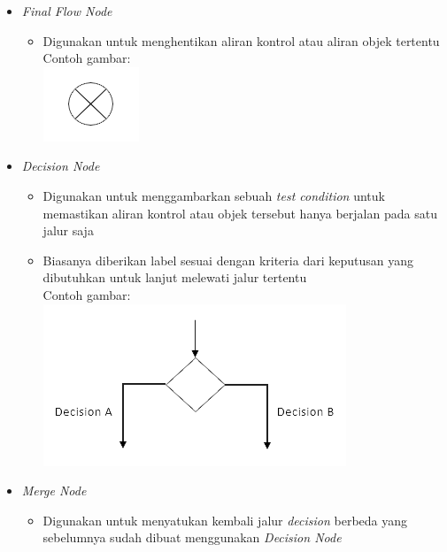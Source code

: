 \documentclass[a4paper]{article}
\begin{document}
\begin{enumerate}
\begin{itemize}
\begin{itemize}
        \end{itemize}
        \item \textit{Final Flow Node}
        \begin{itemize}
            \item Digunakan untuk menghentikan aliran kontrol atau aliran objek tertentu\autocite{systemanalysisdesign-activity-diagram}\\
                  Contoh gambar:\\
                  \includegraphics[scale=0.45]{Final flow node_transparent.png}
        \end{itemize}
        \item \textit{Decision Node}
        \begin{itemize}
            \item Digunakan untuk menggambarkan sebuah \textit{test condition} untuk memastikan aliran kontrol atau objek tersebut hanya berjalan pada satu jalur saja
            \item Biasanya diberikan label sesuai dengan kriteria dari keputusan yang dibutuhkan untuk lanjut melewati jalur tertentu\autocite{systemanalysisdesign-activity-diagram}\\
                  Contoh gambar:\\
                  \includegraphics[scale=0.5]{Decision Node_transparent.png}
        \end{itemize}
        \newpage
        \item \textit{Merge Node}
        \begin{itemize}
            \item Digunakan untuk menyatukan kembali jalur \textit{decision} berbeda yang sebelumnya sudah dibuat menggunakan \textit{Decision Node}\autocite{systemanalysisdesign-activity-diagram}\\

\end{itemize}
\end{itemize}
\end{enumerate}
\end{document}
